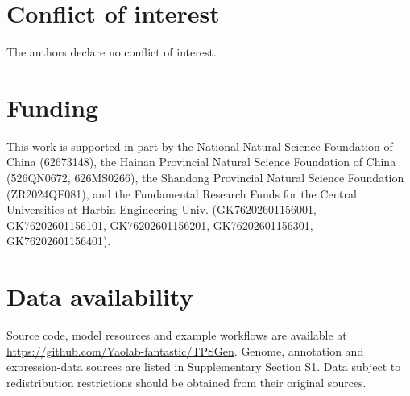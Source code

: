 \documentclass[namedate,webpdf,modern,large]{oup-authoring-template}
\begin{document}
\section*{Conflict of interest}

The authors declare no conflict of interest.

\section*{Funding}
This work is supported in part by the National Natural Science Foundation of China (62673148), the Hainan Provincial Natural Science Foundation of China (526QN0672, 626MS0266), the Shandong Provincial Natural Science Foundation (ZR2024QF081), and the Fundamental Research Funds for the Central Universities at Harbin Engineering Univ. (GK76202601156001, GK76202601156101, GK76202601156201, GK76202601156301, GK76202601156401).

\section*{Data availability}

Source code, model resources and example workflows are available at
\url{https://github.com/Yaolab-fantastic/TPSGen}. Genome, annotation and
expression-data sources are listed in Supplementary Section S1.
Data subject to redistribution restrictions should be obtained from their
original sources.



\end{document}
